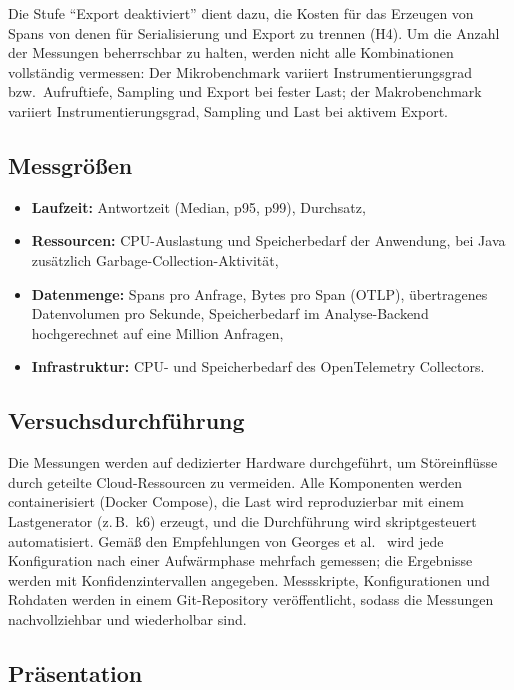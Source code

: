 \documentclass[11pt]{article}
\begin{document}
Die Stufe \enquote{Export deaktiviert} dient dazu, die Kosten für das Erzeugen von Spans von denen für Serialisierung und Export zu trennen (H4). Um die Anzahl der Messungen beherrschbar zu halten, werden nicht alle Kombinationen vollständig vermessen: Der Mikrobenchmark variiert Instrumentierungsgrad bzw.\ Aufruftiefe, Sampling und Export bei fester Last; der Makrobenchmark variiert Instrumentierungsgrad, Sampling und Last bei aktivem Export.

\subsection{Messgrößen}

\begin{itemize}[nosep]
    \item \textbf{Laufzeit:} Antwortzeit (Median, p95, p99), Durchsatz,
    \item \textbf{Ressourcen:} CPU-Auslastung und Speicherbedarf der Anwendung, bei Java zusätzlich Garbage-Collection-Aktivität,
    \item \textbf{Datenmenge:} Spans pro Anfrage, Bytes pro Span (OTLP), übertragenes Datenvolumen pro Sekunde, Speicherbedarf im Analyse-Backend hochgerechnet auf eine Million Anfragen,
    \item \textbf{Infrastruktur:} CPU- und Speicherbedarf des OpenTelemetry Collectors.
\end{itemize}

\subsection{Versuchsdurchführung}

Die Messungen werden auf dedizierter Hardware durchgeführt, um Störeinflüsse durch geteilte Cloud-Ressourcen zu vermeiden. Alle Komponenten werden containerisiert (Docker Compose), die Last wird reproduzierbar mit einem Lastgenerator (z.\,B.\ k6) erzeugt, und die Durchführung wird skriptgesteuert automatisiert. Gemäß den Empfehlungen von Georges et al.\ \cite{georges2007rigorous} wird jede Konfiguration nach einer Aufwärmphase mehrfach gemessen; die Ergebnisse werden mit Konfidenzintervallen angegeben. Messskripte, Konfigurationen und Rohdaten werden in einem Git-Repository veröffentlicht, sodass die Messungen nachvollziehbar und wiederholbar sind.

\subsection{Präsentation}
\end{document}
